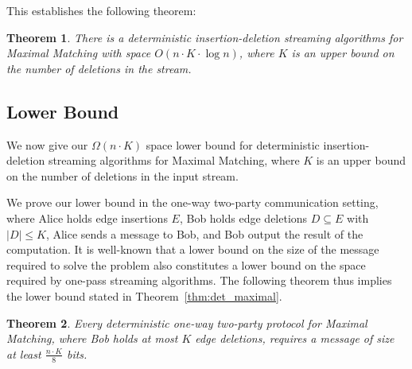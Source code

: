 \documentclass[11pt,a4paper]{article}
\newtheorem{theorem}{Theorem}
\begin{document}
This establishes the following theorem:

\begin{theorem} \label{thm:det-alg}
    There is a deterministic insertion-deletion streaming algorithms for \textsf{Maximal Matching} with space $O(n \cdot K \cdot \log n)$, where $K$ is an upper bound on the number of deletions in the stream. 
\end{theorem}



\subsection{Lower Bound} \label{sec:det-lb}
We now give our $\Omega(n \cdot K)$ space lower bound for deterministic insertion-deletion streaming algorithms for \textsf{Maximal Matching}, where $K$ is an upper bound on the number of deletions in the input stream. 

We prove our lower bound in the one-way two-party communication setting, where Alice holds edge insertions $E$,  Bob holds edge deletions $D \subseteq E$ with $|D| \le K$, Alice sends a message to Bob, and Bob output the result of the computation. It is well-known that a lower bound on the size of the message required to solve the problem also constitutes a lower bound on the space required by one-pass streaming algorithms. The following theorem thus implies the lower bound stated in Theorem~\ref{thm:det_maximal}.

\begin{theorem}
 Every deterministic one-way two-party protocol for \textsf{Maximal Matching}, where Bob holds at most $K$ edge deletions, requires a message of size at least $\frac{n \cdot K}{8}$ bits.
\end{theorem}
\end{document}
